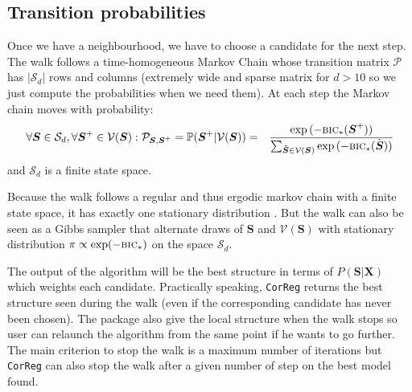 \documentclass[12pt,a4paper]{report}
\begin{document}
	
	
	\subsection{Transition probabilities}
		Once we have a neighbourhood, we have to choose a candidate for the next step.
The walk follows a time-homogeneous Markov Chain whose transition matrix $\mathcal{P}$ has $|\mathcal{S}_d|$ rows and columns (extremely wide  and sparse matrix for $d>10$ so we just compute the probabilities when we need them).
	At each step the Markov chain moves with probability:
	\begin{eqnarray}
			\forall \boldsymbol{S} \in \mathcal{S}_d, \forall \boldsymbol{S}^+\in \mathcal{V}(\boldsymbol{S}) : \mathcal{P}_{\boldsymbol{S},\boldsymbol{S}^+}=\mathbb{P}(\boldsymbol{S}^+|\mathcal{V}(\boldsymbol{S}))&=&\frac{\exp{(-\mbox{{\sc bic}}_*(\boldsymbol{S}^+))}}{\sum_{\tilde{\boldsymbol{S}}\in \mathcal{V}(\boldsymbol{S})}\exp{(-\mbox{{\sc bic}}_*(\tilde{\boldsymbol{S}}))}} 
	\end{eqnarray}
	and $\mathcal{S}_d$ is a finite state space.%
	 
Because the walk follows a regular and thus ergodic markov chain with a finite state space, it has exactly one stationary distribution \cite{grinstead1997introduction}. %
%	
%	
%	
But the walk can also be seen as a Gibbs sampler \cite{casella1992explaining} that alternate draws of $\boldsymbol{S}$ and  $\mathcal{V}(\boldsymbol{S})$ with stationary distribution $\pi \propto \operatorname{exp}(-\mbox{{\sc bic}}_*)$ on the space $\mathcal{S}_d$.
	
The output of the algorithm will be the best structure in terms of $P(\boldsymbol{S}|\boldsymbol{X})$ which weights each candidate. Practically speaking, {\tt CorReg} returns the best structure seen during the walk (even if the corresponding candidate has never been chosen). The package also give the local structure when the walk stops so user can relaunch the algorithm from the same point if he wants to go further.
The main criterion to stop the walk is a maximum number of iterations but {\tt CorReg} can also stop the walk after a given number of step on the best model found.	
	
\end{document}
